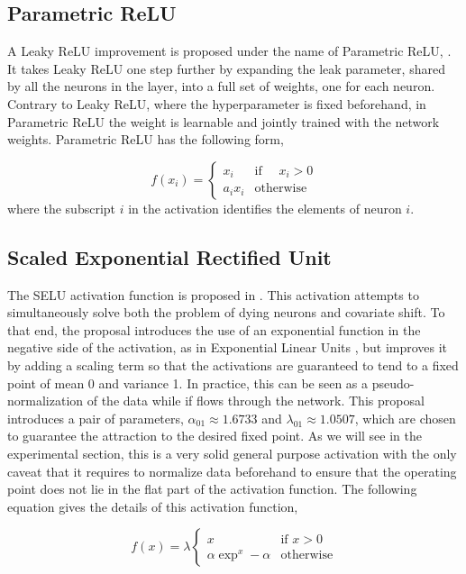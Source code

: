 \documentclass[10pt,twocolumn,letterpaper]{article}
\begin{document}
\subsection{Parametric ReLU}

A Leaky ReLU improvement is proposed under the name of Parametric ReLU, \cite{prelu}. It takes Leaky ReLU one step further by expanding the leak parameter, shared by all the neurons in the layer, into a full set of weights, one for each neuron. Contrary to Leaky ReLU, where the hyperparameter is fixed beforehand, in Parametric ReLU the weight is learnable and jointly trained with the network weights. Parametric ReLU has the following form, 

\begin{equation}
f(x_i)={\begin{cases}x_i&{\mbox{if }}\quad x_i>0\\ a_i x_i &{\mbox{otherwise}}\end{cases}}
\label{eq:parametricrelu}
\end{equation}
where the subscript $i$ in the activation identifies the elements of neuron $i$.

\subsection{Scaled Exponential Rectified Unit}

The SELU activation function is proposed in \cite{selu}. This activation attempts to simultaneously solve both the problem of dying neurons and covariate shift. To that end, the proposal introduces the use of an exponential function in the negative side of the activation, as in Exponential Linear Units \cite{ELU}, but improves it by adding a scaling term so that the activations are guaranteed to tend to a fixed point of mean 0 and variance 1. In practice, this can be seen as a pseudo-normalization of the data while if flows through the network. This proposal introduces a pair of parameters, $\alpha_{01} \approx 1.6733$ and $\lambda_{01} \approx 1.0507$, which are chosen to guarantee the attraction to the desired fixed point. As we will see in the experimental section, this is a very solid general purpose activation with the only caveat that it requires to normalize data beforehand to ensure that the operating point does not lie in the flat part of the activation function. The following equation gives the details of this activation function,

\begin{equation}
f(x)=\lambda{\begin{cases}
    x&{\mbox{if }}x>0\\
    \alpha \exp^x -\alpha&{\mbox{otherwise}}
    \end{cases}}
\label{eq:selu}
\end{equation}
\end{document}
